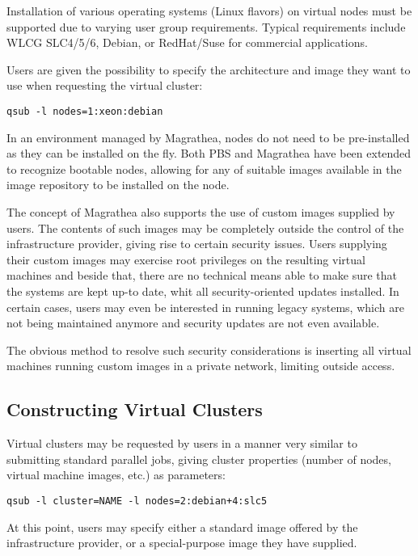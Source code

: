 \documentclass{article}
\begin{document}
Installation of various operating systems (Linux flavors) on virtual nodes must be supported due to varying user group requirements. Typical requirements include WLCG SLC4/5/6, Debian, or RedHat/Suse for commercial applications.

Users are given the possibility to specify the architecture and image they want to use when requesting the virtual cluster:

\medskip

\texttt{qsub -l nodes=1:xeon:debian}

\medskip

In an environment managed by Magrathea, nodes do not need to be pre-installed as they can be installed on the fly. Both PBS and Magrathea have been extended to recognize bootable nodes, allowing for any of suitable images available in the image repository to be installed on the node.

The concept of Magrathea also supports the use of custom images supplied by users. The contents of such images may be completely outside the control of the infrastructure provider, giving rise to certain security issues. Users supplying their custom images may exercise root privileges on the resulting virtual machines and beside that, there are no technical means able to make sure that the systems are kept up-to date, whit all security-oriented updates installed. In certain cases, users may even be interested in running legacy systems, which are not being maintained anymore and security updates are not even available.

The obvious method to resolve such security considerations is inserting all virtual machines running custom images in a private network, limiting outside access.

\subsection{Constructing Virtual Clusters}

Virtual clusters may be requested by users in a manner very similar to submitting standard parallel jobs, giving cluster properties (number of nodes, virtual machine images, etc.) as parameters:

\medskip

\texttt{qsub -l cluster=NAME -l nodes=2:debian+4:slc5}

\medskip

At this point, users may specify either a standard image offered by the infrastructure provider, or a special-purpose image they have supplied.
\end{document}

